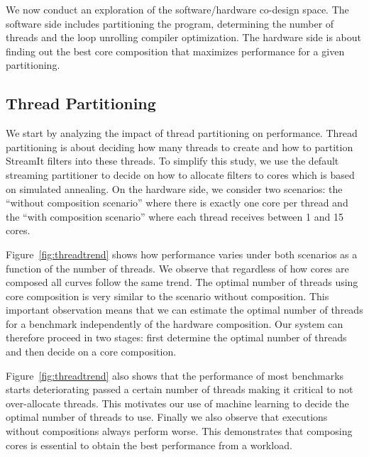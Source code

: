 We now conduct an exploration of the software/hardware co-design space.
The software side includes partitioning the program, determining the number of threads and the loop unrolling compiler optimization.
The hardware side is about finding out the best core composition that maximizes performance for a given partitioning.

\subsection{Thread Partitioning}

We start by analyzing the impact of thread partitioning on performance.
Thread partitioning is about deciding how many threads to create and how to partition StreamIt filters into these threads.
To simplify this study, we use the default streaming partitioner to decide on how to allocate filters to cores which is based on simulated annealing.
On the hardware side, we consider two scenarios:
the ``without composition scenario'' where there is exactly one core per thread and the ``with composition scenario'' where each thread receives between 1 and 15 cores.

Figure~\ref{fig:threadtrend} shows how performance varies under both scenarios as a function of the number of threads.
We observe that regardless of how cores are composed all curves follow the same trend.
The optimal number of threads using core composition is very similar to the scenario without composition.
This important observation means that we can estimate the optimal number of threads for a benchmark independently of the hardware composition.
Our system can therefore proceed in two stages: first determine the optimal number of threads and then decide on a core composition.

Figure~\ref{fig:threadtrend} also shows that the performance of most benchmarks starts deteriorating passed a certain number of threads making it critical to not over-allocate threads.
This motivates our use of machine learning to decide the optimal number of threads to use.
Finally we also observe that executions without compositions always perform worse.
This demonstrates that composing cores is essential to obtain the best performance from a workload.

